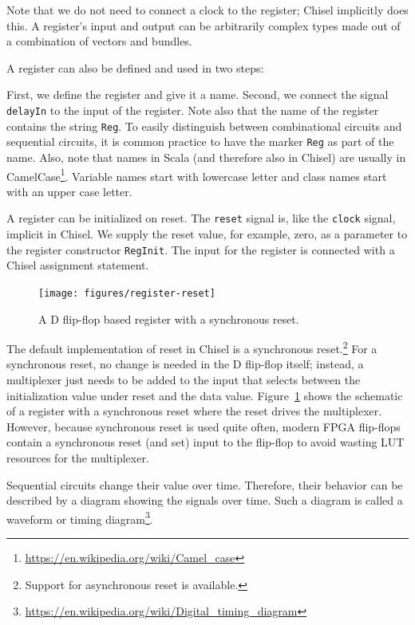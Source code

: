 \documentclass[%
    10pt,
    headinclude, footexclude,
    openright, %
    notitlepage,
    cleardoubleempty,
    headsepline,
    pointlessnumbers,
    bibtotoc, idxtotoc,
    ]{scrbook}
\newcommand{\code}[1]{{\small{\texttt{#1}}}}
\newcommand{\myref}[2]{\href{#1}{#2}}
\renewcommand{\myref}[2]{{#2}{\footnote{\url{#1}}}}
\begin{document}

\noindent Note that we do not need to connect a clock to the register; Chisel implicitly does this.
A register's input and output can be arbitrarily complex types
made out of a combination of vectors and bundles.

A register can also be defined and used in two steps:


First, we define the register and give it a name. Second, we connect the signal
\code{delayIn} to the input of the register. Note also that the name of the register
contains the string \code{Reg}. To easily distinguish between combinational
circuits and sequential circuits, it is common practice to have the marker
\code{Reg} as part of the name. Also, note that names in Scala (and therefore
also in Chisel) are usually in
\myref{https://en.wikipedia.org/wiki/Camel_case}{CamelCase}.
Variable names start with lowercase letter and class names start with an upper case letter.

A register can be initialized on reset. The \code{reset} signal is, like the \code{clock} signal,
implicit in Chisel. We supply the reset value, for example, zero, as a parameter to the register
constructor \code{RegInit}. The input for the register is connected with a Chisel
assignment statement.


\begin{figure}
  \centering
  \texttt{[image: figures/register-reset]}
  \caption{A D flip-flop based register with a synchronous reset.}
  \label{fig:register-reset}
\end{figure}


The default implementation of reset in Chisel is a synchronous
reset.\footnote{Support for asynchronous reset is available.}
For a synchronous reset, no change is needed in the D flip-flop itself; instead, a multiplexer just
needs to be added to the input that
selects between the initialization value under reset and the data value.
Figure~\ref{fig:register-reset} shows the schematic of a register with a synchronous reset
where the reset drives the multiplexer. However, because synchronous reset is used quite often,
modern FPGA flip-flops contain a synchronous reset (and set) input to the flip-flop to avoid wasting
LUT resources for the multiplexer.

Sequential circuits change their value over time. Therefore, their behavior can be described
by a diagram showing the signals over time. Such a diagram is called a waveform or
\myref{https://en.wikipedia.org/wiki/Digital_timing_diagram}{timing diagram}.
\end{document}
